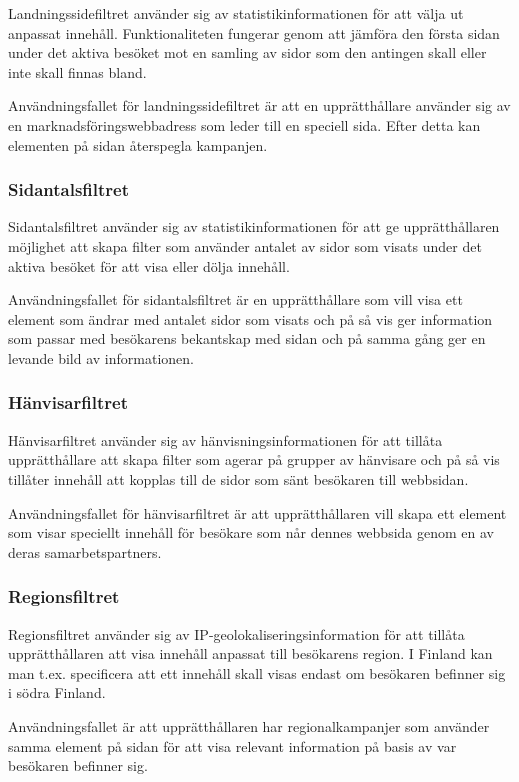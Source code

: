 Landningssidefiltret använder sig av statistikinformationen för att välja ut anpassat innehåll. Funktionaliteten fungerar genom att jämföra den första sidan under det aktiva besöket mot en samling av sidor som den antingen skall eller inte skall finnas bland.

Användningsfallet för landningssidefiltret är att en upprätthållare använder sig av en marknadsföringswebbadress som leder till en speciell sida. Efter detta kan elementen på sidan återspegla kampanjen.

\subsubsection{Sidantalsfiltret}

Sidantalsfiltret använder sig av statistikinformationen för att ge upprätthållaren möjlighet att skapa filter som använder antalet av sidor som visats under det aktiva besöket för att visa eller dölja innehåll.

Användningsfallet för sidantalsfiltret är en upprätthållare som vill visa ett element som ändrar med antalet sidor som visats och på så vis ger information som passar med besökarens bekantskap med sidan och på samma gång ger en levande bild av informationen.

\subsubsection{Hänvisarfiltret}

Hänvisarfiltret använder sig av hänvisningsinformationen för att tillåta upprätthållare att skapa filter som agerar på grupper av hänvisare och på så vis tillåter innehåll att kopplas till de sidor som sänt besökaren till webbsidan.

Användningsfallet för hänvisarfiltret är att upprätthållaren vill skapa ett element som visar speciellt innehåll för besökare som når dennes webbsida genom en av deras samarbetspartners.

\subsubsection{Regionsfiltret}

Regionsfiltret använder sig av IP-geolokaliseringsinformation för att tillåta upprätthållaren att visa innehåll anpassat till besökarens region. I Finland kan man t.ex. specificera att ett innehåll skall visas endast om besökaren befinner sig i södra Finland.

Användningsfallet är att upprätthållaren har regionalkampanjer som använder samma element på sidan för att visa relevant information på basis av var besökaren befinner sig.

